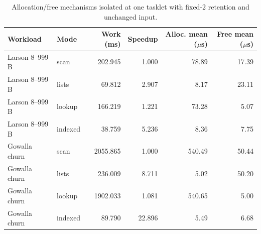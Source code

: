\begin{table}[t]
\caption{Allocation/free mechanisms isolated at one tasklet with fixed-2 retention and unchanged input.}\label{tab:ablation}
\centering\small
\begin{tabular}{llrrrr}\toprule
Workload & Mode & Work (ms) & Speedup & Alloc. mean ($\mu$s) & Free mean ($\mu$s) \\ \midrule
Larson 8--999 B & scan & 202.945 & 1.000 & 78.89 & 17.39 \\
Larson 8--999 B & lists & 69.812 & 2.907 & 8.17 & 23.11 \\
Larson 8--999 B & lookup & 166.219 & 1.221 & 73.28 & 5.07 \\
Larson 8--999 B & indexed & 38.759 & 5.236 & 8.36 & 7.75 \\
Gowalla churn & scan & 2055.865 & 1.000 & 540.49 & 50.44 \\
Gowalla churn & lists & 236.009 & 8.711 & 5.02 & 50.20 \\
Gowalla churn & lookup & 1902.033 & 1.081 & 540.65 & 5.00 \\
Gowalla churn & indexed & 89.790 & 22.896 & 5.49 & 6.68 \\
\bottomrule\end{tabular}
\end{table}
